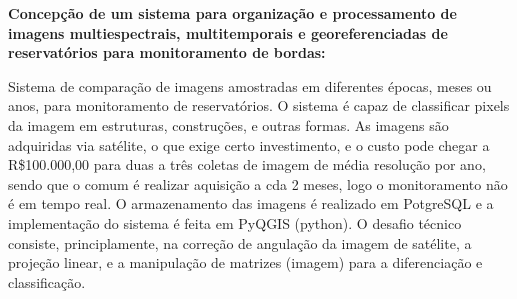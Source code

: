 
\textbf{Concepção de um sistema para organização e processamento de imagens
multiespectrais, multitemporais e georeferenciadas de reservatórios para
monitoramento de bordas:}

Sistema de comparação de imagens amostradas em diferentes épocas, meses ou anos,
para monitoramento de reservatórios. O sistema é capaz de classificar pixels da
imagem em estruturas, construções, e outras formas. As imagens são adquiridas
via satélite, o que exige certo investimento, e o custo pode chegar a
R\$100.000,00 para duas a três coletas de imagem de média resolução por ano,
sendo que o comum é realizar aquisição a cda 2 meses, logo o monitoramento não é
em tempo real. O armazenamento das imagens é realizado em PotgreSQL e a
implementação do sistema é feita em PyQGIS (python). O desafio técnico consiste,
principlamente, na correção de angulação da imagem de satélite, a projeção
linear, e a manipulação de matrizes (imagem) para a diferenciação e
classificação.
